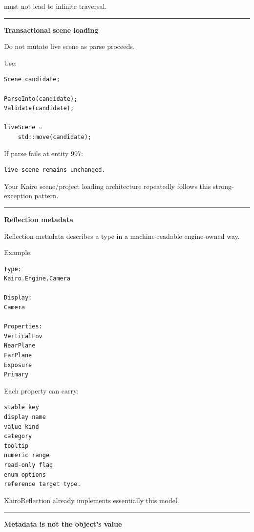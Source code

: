 must not lead to infinite traversal.

\begin{center}\rule{0.5\linewidth}{0.5pt}\end{center}

\textbf{Transactional scene loading}

Do not mutate live scene as parse proceeds.

Use:

\begin{verbatim}
Scene candidate;

ParseInto(candidate);
Validate(candidate);

liveScene =
    std::move(candidate);
\end{verbatim}

If parse fails at entity 997:

\begin{verbatim}
live scene remains unchanged.
\end{verbatim}

Your Kairo scene/project loading architecture repeatedly follows this strong-exception pattern.

\begin{center}\rule{0.5\linewidth}{0.5pt}\end{center}

\textbf{Reflection metadata}

Reflection metadata describes a type in a machine-readable engine-owned way.

Example:

\begin{verbatim}
Type:
Kairo.Engine.Camera

Display:
Camera

Properties:
VerticalFov
NearPlane
FarPlane
Exposure
Primary
\end{verbatim}

Each property can carry:

\begin{verbatim}
stable key
display name
value kind
category
tooltip
numeric range
read-only flag
enum options
reference target type.
\end{verbatim}

KairoReflection already implements essentially this model.

\begin{center}\rule{0.5\linewidth}{0.5pt}\end{center}

\textbf{Metadata is not the object's value}

